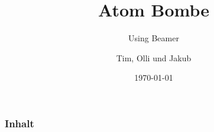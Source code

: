 \documentclass{beamer}
\title{Atom Bombe}
\subtitle{Using Beamer}
\author{Tim, Olli und Jakub}
\institute{Kanti Baden}
\date{\today}
\begin{document}
\begin{frame}
\titlepage
\end{frame}

\begin{frame}
\frametitle{Inhalt}
\end{frame}
\end{document}
